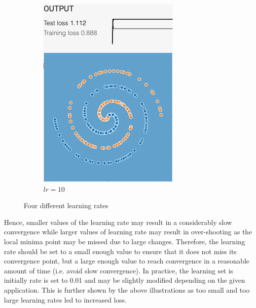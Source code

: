 \documentclass[12pt,a4paper]{article}
\begin{document}
\begin{enumerate}
\begin{figure}[H]
\begin{subfigure}[H]{0.2\textwidth}
				\includegraphics[width=\textwidth]{Figures/lr/10}
				\caption{$lr=10$}
			\end{subfigure}
			\caption{Four different learning rates}
		\end{figure}
		\vspace{-0.5cm}
		\noindent Hence, smaller values of the learning rate may result in a considerably slow convergence while larger values of learning rate may result in over-shooting as the local minima point may be missed due to large changes. Therefore, the learning rate should be set to a small enough value to ensure that it does not miss its convergence point, but a large enough value to reach convergence in a reasonable amount of time (i.e. avoid slow convergence). In practice, the learning set is initially rate is set to 0.01 and may be slightly modified depending on the given application. This is further shown by the above illustrations as too small and too large learning rates led to increased loss.
		

\end{enumerate}
\end{document}
